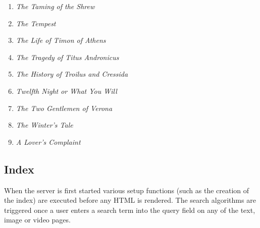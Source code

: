 \begin{enumerate}
  \item \textit{The Taming of the Shrew}
  \item \textit{The Tempest}
  \item \textit{The Life of Timon of Athens}
  \item \textit{The Tragedy of Titus Andronicus}
  \item \textit{The History of Troilus and Cressida}
  \item \textit{Twelfth Night or What You Will}
  \item \textit{The Two Gentlemen of Verona}
  \item \textit{The Winter's Tale}
  \item \textit{A Lover's Complaint}
\end{enumerate}



\subsection{Index}
\label{s:index}

When the server is first started various setup functions (such as the creation of the index) are executed before any \ac{HTML} is rendered. The search algorithms are triggered once a user enters a search term into the query field on any of the text, image or video pages.

